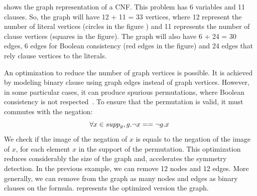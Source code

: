  shows the graph representation of a CNF. This problem has 6 variables and 11
clauses. So, the graph will have  12  + 11 = 33 vertices, where 12 represent the number of literal vertices (circles in the figure ) 
and 11 represents the number of clause vertices (squares in the figure). The graph will also have 6 + 24 = 30 edges, 6 
edges for Boolean consistency (red edges in the figure) and 24 edges that rely clause vertices to the literals.

%
%
%

An optimization to reduce the number of graph vertices is possible. It is achieved by modeling binary clause
using graph edges instead of graph vertices.  However, in some particular cases, it can produce
spurious permutations, where Boolean consistency is not respected~\cite{aloul2003solving}.
To ensure that the permutation is valid, it must commutes with the negation:
$$\forall x \in supp_g, g.\neg x == \neg g.x$$
We check if the image of the negation of $x$ is equals to the negation of the image of $x$,
for each element $x$ in the support of the permutation.
This optimization reduces considerably the size of the 
graph and, accelerates the symmetry detection.
In the previous example, we can remove 12 nodes and 12 edges. More generally,
we can remove from the graph as many nodes and edges as binary clauses on the formula.
 represents the optimized version the graph.

